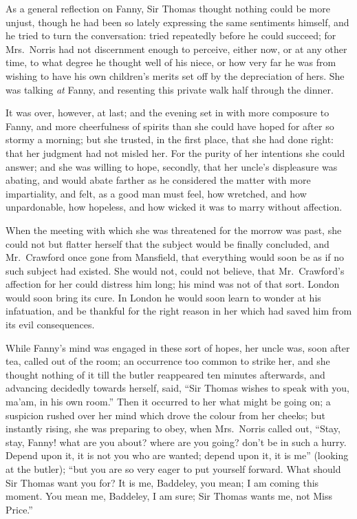 \documentclass{article}
\begin{document}
As a general reflection on Fanny, Sir Thomas thought
nothing could be more unjust, though he had been so lately
expressing the same sentiments himself, and he tried to turn
the conversation:  tried repeatedly before he could succeed;
for Mrs.\ Norris had not discernment enough to perceive,
either now, or at any other time, to what degree he
thought well of his niece, or how very far he was from
wishing to have his own children's merits set off by
the depreciation of hers.  She was talking \emph{at} Fanny,
and resenting this private walk half through the dinner.

It was over, however, at last; and the evening set in with
more composure to Fanny, and more cheerfulness of spirits
than she could have hoped for after so stormy a morning;
but she trusted, in the first place, that she had done right:
that her judgment had not misled her.  For the purity
of her intentions she could answer; and she was willing
to hope, secondly, that her uncle's displeasure was abating,
and would abate farther as he considered the matter with
more impartiality, and felt, as a good man must feel,
how wretched, and how unpardonable, how hopeless,
and how wicked it was to marry without affection.

When the meeting with which she was threatened for the
morrow was past, she could not but flatter herself that
the subject would be finally concluded, and Mr.\ Crawford
once gone from Mansfield, that everything would soon
be as if no such subject had existed.  She would not,
could not believe, that Mr.\ Crawford's affection for her
could distress him long; his mind was not of that sort.
London would soon bring its cure.  In London he would
soon learn to wonder at his infatuation, and be thankful
for the right reason in her which had saved him from its
evil consequences.

While Fanny's mind was engaged in these sort of hopes,
her uncle was, soon after tea, called out of the room;
an occurrence too common to strike her, and she thought nothing
of it till the butler reappeared ten minutes afterwards,
and advancing decidedly towards herself, said, ``Sir Thomas
wishes to speak with you, ma'am, in his own room.''
Then it occurred to her what might be going on; a suspicion
rushed over her mind which drove the colour from her cheeks;
but instantly rising, she was preparing to obey, when Mrs.\ Norris
called out, ``Stay, stay, Fanny! what are you about? where
are you going? don't be in such a hurry.  Depend upon it,
it is not you who are wanted; depend upon it, it is me''
(looking at the butler); ``but you are so very eager to put
yourself forward.  What should Sir Thomas want you for?
It is me, Baddeley, you mean; I am coming this moment.
You mean me, Baddeley, I am sure; Sir Thomas wants me,
not Miss Price.''
\end{document}
